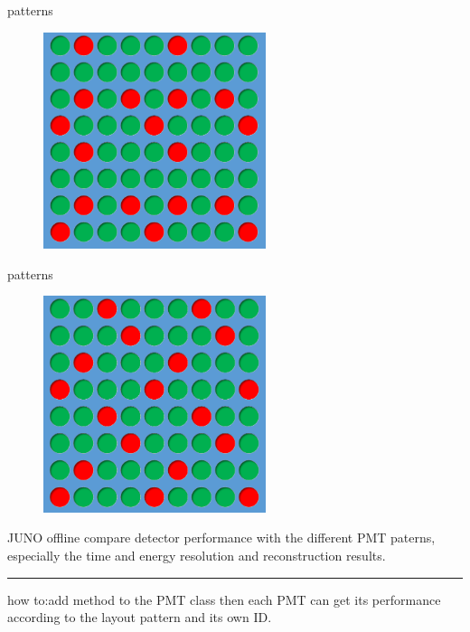 \documentclass[11pt,compress,xcolor=x11names,UTF8]{beamer}
\begin{document}
\begin{frame}{patterns}
\begin{figure}
\centering
\includegraphics[width=0.58\textwidth]{pat7} %
\end{figure}

\end{frame}
\begin{frame}{patterns}
\begin{figure}
\centering
\includegraphics[width=0.58\textwidth]{pat8} %
\end{figure}

\end{frame}

\begin{frame}{ JUNO offline}
compare detector performance with the different PMT paterns, especially the time and energy resolution and reconstruction results.

\hrule{\textwidth}

how to:add method to the PMT class then each PMT can get its performance according to the layout pattern and its own ID. 
\end{frame}
\end{document}
